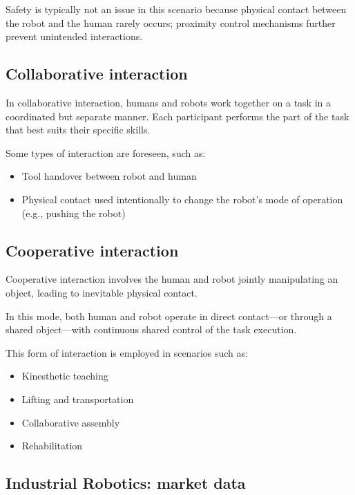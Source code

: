 Safety is typically not an issue in this scenario because physical contact between the robot and the human rarely occurs; proximity control mechanisms further prevent unintended interactions.

\hfill

\subsection{Collaborative interaction}

In collaborative interaction, humans and robots work together on a task in a coordinated but separate manner. Each participant performs the part of the task that best suits their specific skills.

Some types of interaction are foreseen, such as:
\begin{itemize}
  \item Tool handover between robot and human
  \item Physical contact used intentionally to change the robot’s mode of operation (e.g., pushing the robot)
\end{itemize}

\hfill

\subsection{Cooperative interaction}

Cooperative interaction involves the human and robot jointly manipulating an object, leading to inevitable physical contact.

In this mode, both human and robot operate in direct contact—or through a shared object—with continuous shared control of the task execution.

This form of interaction is employed in scenarios such as:
\begin{itemize}
  \item Kinesthetic teaching
  \item Lifting and transportation
  \item Collaborative assembly
  \item Rehabilitation
\end{itemize}

\hfill

\subsection{Industrial Robotics: market data}

